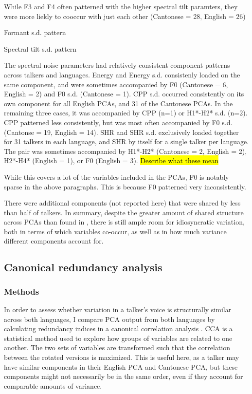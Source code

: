 While F3 and F4 often patterned with the higher spectral tilt paramters, they were more liekly to cooccur with just each other (Cantonese = 28, English = 26)

Formant s.d. pattern

Spectral tilt s.d. pattern 

The spectral noise parameters had relatively consistent component patterns across talkers and languages. Energy and Energy s.d. consistenly loaded on the same component, and were sometimes accompanied by F0 (Cantonese = 6, English = 2) and F0 s.d. (Cantonese = 1). CPP s.d. occurred consistently on its own component for all English PCAs, and 31 of the Cantonese PCAs. In the remaining three cases, it was accompanied by CPP (n=1) or H1*-H2* s.d. (n=2). CPP patterned less consistently, but was most often accompanied by F0 s.d. (Cantonse = 19, English = 14). SHR and SHR s.d. exclusively loaded together for 31 talkers in each language, and SHR by itself for a single talker per language. The pair was sometimes accompanied by H1*-H2* (Cantonese = 2, English = 2), H2*-H4* (English = 1), or F0 (English = 3). \hl{Describe what these mean}


While this covers a lot of the variables included in the PCAs, F0 is notably sparse in the above paragraphs. This is because F0 patterned very inconsistently. %


There were additional components (not reported here) that were shared by less than half of talkers. In summary, despite the greater amount of shared structure across PCAs than found in \citet{lee_2019_acoustic}, there is still ample room for idiosyncratic variation, both in terms of which variables co-occur, as well as in how much variance different components account for. 

\subsection{Canonical redundancy analysis}\label{ch3:sec:cca}
\subsubsection{Methods}
In order to assess whether variation in a talker's voice is structurally similar across both languages, I compare PCA output from both languages by calculating redundancy indices in a canonical correlation analysis \citep[CCA][]{stewart_1968_canonical, jolliffe_2002_pca}.  CCA is a statistical method used to explore how groups of variables are related to one another. The two sets of variables are transformed such that the correlation between the rotated versions is maximized. This is useful here, as a talker may have similar components in their English PCA and Cantonese PCA, but these components might not necessarily be in the same order, even if they account for comparable amounts of variance.

